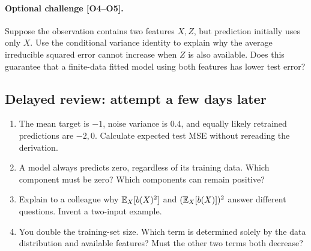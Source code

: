 \paragraph{Optional challenge [O4--O5].} Suppose the observation contains two features $X,Z$, but prediction initially uses only $X$. Use the conditional variance identity to explain why the average irreducible squared error cannot increase when $Z$ is also available. Does this guarantee that a finite-data fitted model using both features has lower test error?

\subsection*{Delayed review: attempt a few days later}
\begin{enumerate}[label=R\arabic*.]
\item The mean target is $-1$, noise variance is $0.4$, and equally likely retrained predictions are $-2,0$. Calculate expected test MSE without rereading the derivation.
\item A model always predicts zero, regardless of its training data. Which component must be zero? Which components can remain positive?
\item Explain to a colleague why $\mathbb{E}_X[b(X)^2]$ and $(\mathbb{E}_X[b(X)])^2$ answer different questions. Invent a two-input example.
\item You double the training-set size. Which term is determined solely by the data distribution and available features? Must the other two terms both decrease?
\end{enumerate}

